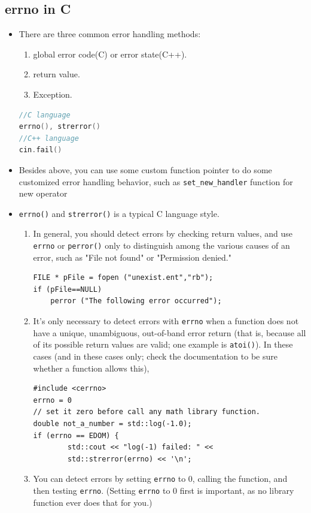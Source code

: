 \documentclass[a4paper,11pt,twoside]{book}
\begin{document}
\subsection{errno in C}
\begin{itemize}
	
	\item There are three common error handling methods:
	\begin{enumerate}
		\item global error code(C) or error state(C++).
		\item return value.
		\item Exception.
	\end{enumerate}
\begin{lstlisting}[frame=single, language=c++]
//C language
errno(), strerror()
//C++ language
cin.fail()
\end{lstlisting}


	\item Besides above, you can use some custom function pointer to do some customized error handling behavior, such as \texttt{set\_new\_handler} function for new operator
	
	\item \texttt{errno()} and \texttt{strerror()} is a typical C language style.
	
	\begin{enumerate}
		\item In general, you should detect errors by checking return values, and use \texttt{errno} or \texttt{perror()} only to distinguish among the various causes of an error, such as "File not found" or "Permission denied."
		
\begin{lstlisting}[numbers=none]
FILE * pFile = fopen ("unexist.ent","rb");
if (pFile==NULL)
	perror ("The following error occurred");
\end{lstlisting}
		
		\item It's only necessary to detect errors with \texttt{errno} when a function does not have a unique, unambiguous, out-of-band error return (that is, because all of its possible return values are valid; one example is \texttt{atoi()}). In these cases (and in these cases only; check the documentation to be sure whether a function allows this),
\begin{lstlisting}[numbers=none]
#include <cerrno>
errno = 0
// set it zero before call any math library function.
double not_a_number = std::log(-1.0);
if (errno == EDOM) {
		std::cout << "log(-1) failed: " <<
		std::strerror(errno) << '\n';
\end{lstlisting}
		\item You can detect errors by setting \texttt{errno} to 0, calling the function, and then testing \texttt{errno}. (Setting \texttt{errno} to 0 first is important, as no library function ever does that for you.)
	\end{enumerate}
	

\end{itemize}
\end{document}
